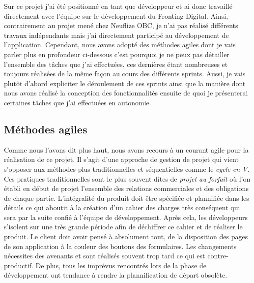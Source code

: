 	Sur ce projet j'ai été positionné en tant que développeur et ai donc travaillé directement avec l'équipe sur le développement du Fronting Digital. Ainsi, contrairement au projet mené chez Neuflize OBC, je n'ai pas réalisé différents travaux indépendants mais j'ai directement participé au développement de l'application. Cependant, nous avons adopté des méthodes agiles dont je vais parler plus en profondeur ci-dessous c'est pourquoi je ne peux pas détailler l'ensemble des tâches que j'ai effectuées, ces dernières étant nombreuses et toujours réalisées de la même façon au cours des différents sprints. Aussi, je vais plutôt d'abord expliciter le déroulement de ces sprints ainsi que la manière dont nous avons réalisé la conception des fonctionnalités ensuite de quoi je présenterai certaines tâches que j'ai effectuées en autonomie.

\subsection{Méthodes agiles}
	Comme nous l'avons dit plus haut, nous avons recours à un courant agile pour la réalisation de ce projet. Il s'agit d'une approche de gestion de projet qui vient s'opposer aux méthodes plus traditionnelles et séquentielles comme le \textit{cycle en V}. Ces pratiques traditionnelles sont le plus souvent dîtes de \textit{projet au forfait} où l'on établi en début de projet l'ensemble des relations commerciales et des obligations de chaque partie. L'intégralité du produit doit être spécifiée et plannifiée dans les détails ce qui aboutit à la création d'un cahier des charges très conséquent qui sera par la suite confié à l'équipe de développement. Après cela, les développeurs s'isolent sur une très grande période afin de déchiffrer ce cahier et de réaliser le produit. Le client doit avoir pensé à absolument tout, de la disposition des pages de son application à la couleur des boutons des formulaires. Les changements nécessites des avenants et sont réalisés souvent trop tard ce qui est contre-productif. De plus, tous les imprévus rencontrés lors de la phase de développement ont tendance à rendre la plannification de départ obsolète. \\
	
